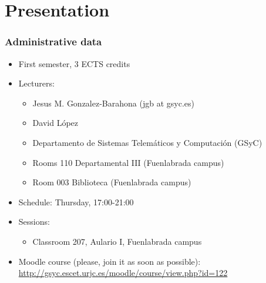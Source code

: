 
\section{Presentation}


\begin{frame}
\frametitle{Administrative data}

\begin{itemize}
\item First semester, 3 ECTS credits
\item Lecturers:
  \begin{itemize}
  \item Jesus M. Gonzalez-Barahona (jgb at gsyc.es)
  \item David López
  \item Departamento de Sistemas Telemáticos y Computación (GSyC)
  \item Rooms 110 Departamental III (Fuenlabrada campus)
  \item Room 003 Biblioteca (Fuenlabrada campus)
  \end{itemize}
\item Schedule: Thursday, 17:00-21:00
\item Sessions:
  \begin{itemize}
  \item Classroom 207, Aulario I, Fuenlabrada campus
  \end{itemize}
\item Moodle course (please, join it as soon as possible): \\
  {\footnotesize \url{http://gsyc.escet.urjc.es/moodle/course/view.php?id=122}}
\end{itemize}
\end{frame}


